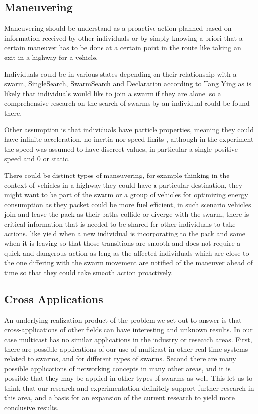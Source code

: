 \documentclass[journal]{IEEEtran}
\begin{document}
\subsection{Maneuvering}
Maneuvering should be understand as a proactive action planned based on information received by other individuals or by simply knowing a priori that a certain maneuver has to be done at a certain point in the route like taking an exit in a highway for a vehicle.

Individuals could be in various states depending on their relationship with a swarm, SingleSearch, SwarmSearch and Declaration according to Tang Ying \cite{HH4} as is likely that individuals would like to join a swarm if they are alone, so a comprehensive research on the search of swarms by an individual could be found there.

Other assumption is that individuals have particle properties, meaning they could have infinite acceleration, no inertia nor speed limits \cite{HH4}, although in the experiment the speed was assumed to have discreet values, in particular a single positive speed and 0 or static.

There could be distinct types of maneuvering, for example thinking in the context of vehicles in a highway they could have a particular destination, they might want to be part of the swarm or a group of vehicles for optimizing energy consumption as they packet could be more fuel efficient, in such scenario vehicles join and leave the pack as their paths collide or diverge with the swarm, there is critical information that is needed to be shared for other individuals to take actions, like yield when a new individual is incorporating to the pack and same when it is leaving so that those transitions are smooth and does not require a quick and dangerous action as long as the affected individuals which are close to the one differing with the swarm movement are notified of the maneuver ahead of time so that they could take smooth action proactively.

\subsection{Cross Applications}
An underlying realization product of the problem we set out to answer is that cross-applications of other fields can have interesting and unknown results. In our case multicast has no similar applications in the industry or research areas. First, there are possible applications of our use of multicast in other real time systems related to swarms, and for different types of swarms. Second there are many possible applications of networking concepts in many other areas, and it is possible that they may be applied in other types of swarms as well. 
This let us to think that our research and experimentation definitely support further research in this area, and a basis for an expansion of the current research to yield more conclusive results. 
\end{document}
